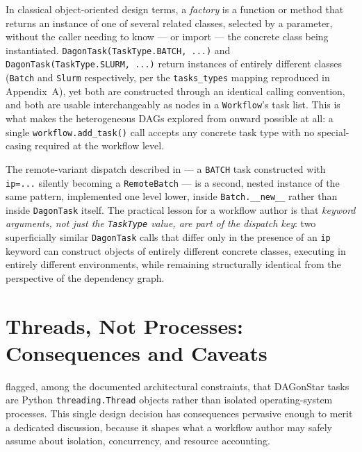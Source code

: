 In classical object-oriented design terms, a \emph{factory} is a function or
method that returns an instance of one of several related classes, selected
by a parameter, without the caller needing to know --- or import --- the
concrete class being instantiated. \texttt{DagonTask(TaskType.BATCH, ...)}
and \texttt{DagonTask(TaskType.SLURM, ...)} return instances of entirely
different classes (\texttt{Batch} and \texttt{Slurm} respectively, per the
\texttt{tasks\_types} mapping reproduced in Appendix~A), yet both are
constructed through an identical calling convention, and both are usable
interchangeably as nodes in a \texttt{Workflow}'s task list. This is what
makes the heterogeneous DAGs explored from  onward
possible at all: a single \texttt{workflow.add\_task()} call accepts any
concrete task type with no special-casing required at the workflow level.

The remote-variant dispatch described in  --- a
\texttt{BATCH} task constructed with \texttt{ip=...} silently becoming a
\texttt{RemoteBatch} --- is a second, nested instance of the same pattern,
implemented one level lower, inside \texttt{Batch.\_\_new\_\_} rather than
inside \texttt{DagonTask} itself. The practical lesson for a workflow author
is that \emph{keyword arguments, not just the \texttt{TaskType} value, are
part of the dispatch key}: two superficially similar \texttt{DagonTask}
calls that differ only in the presence of an \texttt{ip} keyword can
construct objects of entirely different concrete classes, executing in
entirely different environments, while remaining structurally identical from
the perspective of the dependency graph.

\section{Threads, Not Processes: Consequences and Caveats}
\label{sec:threads-not-processes}

 flagged, among the documented architectural
constraints, that DAGonStar tasks are Python \texttt{threading.Thread}
objects rather than isolated operating-system processes. This single design
decision has consequences pervasive enough to merit a dedicated discussion,
because it shapes what a workflow author may safely assume about isolation,
concurrency, and resource accounting.

